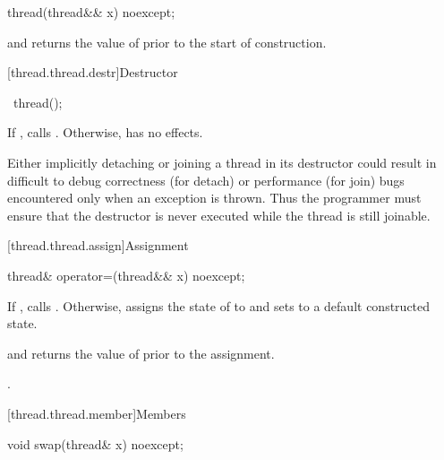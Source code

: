 %
\begin{itemdecl}
thread(thread&& x) noexcept;
\end{itemdecl}

\begin{itemdescr}
\pnum
\ensures
{} and  returns the
value of  prior to the start of construction.
\end{itemdescr}

[thread.thread.destr]{Destructor}

%
\begin{itemdecl}
~thread();
\end{itemdecl}

\begin{itemdescr}
\pnum
\effects
If , calls . Otherwise, has no effects.
\begin{note}
Either implicitly detaching or joining a  thread in its
destructor could result in difficult to debug correctness (for detach) or performance
(for join) bugs encountered only when an exception is thrown. Thus the programmer must
ensure that the destructor is never executed while the thread is still joinable.
\end{note}
\end{itemdescr}

[thread.thread.assign]{Assignment}

%
\begin{itemdecl}
thread& operator=(thread&& x) noexcept;
\end{itemdecl}

\begin{itemdescr}
\pnum
\effects
If , calls . Otherwise, assigns the
state of  to  and sets  to a default constructed state.

\pnum
\ensures
{} and  returns the value of
 prior to the assignment.

\pnum
\returns
{}.
\end{itemdescr}

[thread.thread.member]{Members}

%
\begin{itemdecl}
void swap(thread& x) noexcept;
\end{itemdecl}


